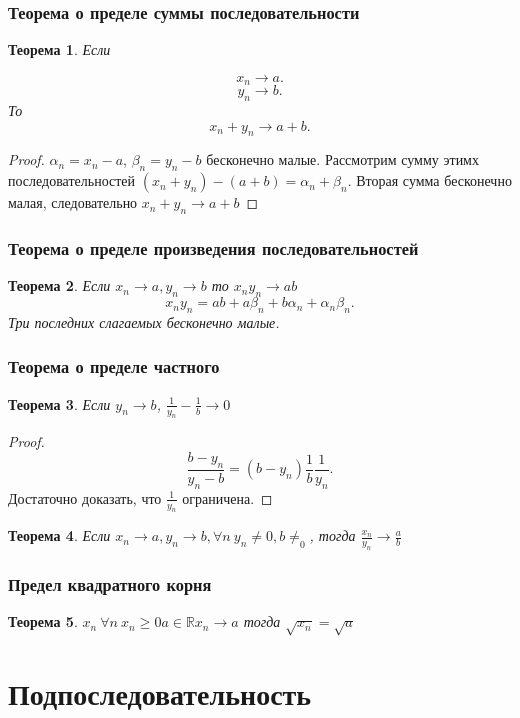 \documentclass[a4paper]{article}
\newtheorem{theorem}{Теорема}
\begin{document}
\subsubsection{Теорема о пределе суммы последовательности}
\begin{theorem}
	Если

	\[

		x_n \to a
		.\]
	\[
		y_n \to b
		.\]
	То
	\[
		x_n + y_n \to a + b
		.\]
\end{theorem}
\begin{proof}
	$\alpha_n = x_n - a$,  $\beta_n = y_n - b$ бесконечно малые.
	Рассмотрим  сумму этимх последовательностей $(x_n + y_n) - (a + b) = \alpha_n + \beta_n$. Вторая сумма бесконечно малая, следовательно  $x_n + y_n \to a + b$
\end{proof}
\subsubsection{Теорема о пределе произведения последовательностей}
\begin{theorem}
	Если $x_n \to a, y_n \to b $ то $ x_n y_n \to ab$
	\[
		x_n y_n = ab + a\beta_n + b \alpha_n + \alpha_n \beta_n
		.\]
	Три последних слагаемых бесконечно малые.
\end{theorem}
\subsubsection{Теорема о пределе частного}
\begin{theorem}
	Если $y_n \to b$, $\frac{1}{y_n} - \frac{1}{b} \to 0$
\end{theorem}
\begin{proof}
	\[
		\frac{b - y_n}{y_n- b} = (b - y_n)  \frac{1}{b}\frac{1}{y_n}
		.\]
	Достаточно доказать, что $\frac{1}{y_n}$ ограничена.
\end{proof}
\begin{theorem}
	Если $x_n \to a, y_n \to b , \forall n ~ y_n \neq 0, b\neq_0$, тогда
	$\frac{x_n}{y_n} \to \frac{a}{b}$
\end{theorem}
\subsubsection{Предел квадратного корня}
\begin{theorem}
	$x_n ~\forall n ~x_n \ge 0  a \in \mathbb{R} x_n \to a$ тогда $\sqrt{x_n} = \sqrt{a}$
\end{theorem}
\section{Подпоследовательность}
\end{document}
